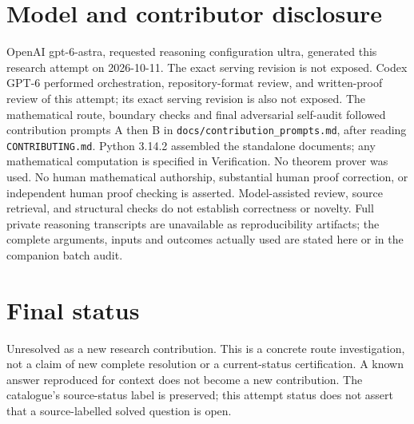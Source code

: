 \documentclass[11pt]{article}
\begin{document}
\section{Model and contributor disclosure}
OpenAI gpt-6-astra, requested reasoning configuration ultra, generated this research
attempt on 2026-10-11. The exact serving revision is not exposed. Codex GPT-6
performed orchestration, repository-format review, and written-proof review of this attempt; its exact serving revision
is also not exposed. The mathematical route, boundary checks and final adversarial
self-audit followed contribution prompts A then B in
\texttt{docs/contribution\_prompts.md}, after reading \texttt{CONTRIBUTING.md}.
Python 3.14.2 assembled the standalone documents; any mathematical computation is
specified in Verification. No theorem prover was used. No human mathematical
authorship, substantial human proof correction, or independent human proof checking
is asserted. Model-assisted review, source retrieval, and structural checks do not
establish correctness or novelty. Full private reasoning transcripts are unavailable
as reproducibility artifacts; the complete arguments, inputs and outcomes actually
used are stated here or in the companion batch audit.
\section{Final status}
Unresolved as a new research contribution. This is a concrete route investigation,
not a claim of new complete resolution or a current-status certification. A known
answer reproduced for context does not become a new contribution. The catalogue's
source-status label is preserved; this attempt status does not assert that a
source-labelled solved question is open.
\end{document}

